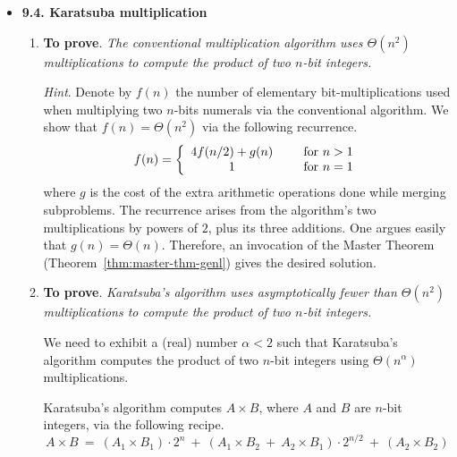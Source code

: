 \begin{itemize}
\item
{\bf 9.4. Karatsuba multiplication} 

\smallskip

\begin{enumerate}
\item 
{\bf To prove}.
{\em The conventional multiplication algorithm uses $\Theta(n^2)$ multiplications to compute the product of two $n$-bit integers.}

\medskip

{\em Hint}.  Denote by $f(n)$ the number of elementary bit-multiplications used when multiplying two $n$-bits numerals via the conventional algorithm.  We show that $f(n) = \Theta(n^2)$ via the following recurrence.
\[ f(n) = \left\{
\begin{array}{cl}
4 f(n/2) + g(n) & \hspace*{.2in} \mbox{for } n > 1 \\
                    1 & \hspace*{.2in} \mbox{for } n = 1
\end{array}
\right. \]
where $g$ is the cost of the extra arithmetic operations done while merging subproblems.  The recurrence arises from the algorithm's two multiplications by powers of $2$, plus its three additions.  One argues easily that $g(n) = \Theta(n)$.  Therefore, an invocation of the Master Theorem (Theorem~\ref{thm:master-thm-genl}) gives the desired solution. 

\medskip\item
{\bf To prove}.
{\em Karatsuba's algorithm uses {\em asymptotically fewer than} $\Theta(n^2)$ multiplications to compute the product of two $n$-bit integers.}

\smallskip

We need to exhibit a (real) number $\alpha < 2$ such that Karatsuba's algorithm computes the product of two $n$-bit integers using $\Theta(n^\alpha)$ multiplications.

\medskip

Karatsuba's algorithm computes $A \times B$, where $A$ and $B$ are $n$-bit integers, via the following recipe.
\begin{equation}
\label{eq:karatsuba-normal-app}
A \times B \ = \ (A_1 \times B_1) \cdot 2^n \ + \  (A_1 \times B_2 \ + \ A_2 \times B_1) \cdot 2^{n/2} \ + \ (A_2 \times B_2)
\end{equation}

\smallskip


\end{enumerate}
\end{itemize}
